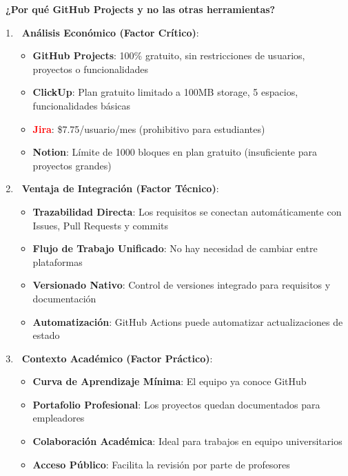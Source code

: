 \documentclass[12pt,a4paper]{article}
\begin{document}
\begin{tcolorbox}[colback=successgreen!10, colframe=successgreen, rounded corners, title=\faCheckCircle\ Análisis de la Decisión]

\textbf{\faBalanceScale\ ¿Por qué GitHub Projects y no las otras herramientas?}

\begin{enumerate}[itemsep=0.5em]
    \item \textbf{\faDollarSign\ Análisis Económico (Factor Crítico)}:
    \begin{itemize}[itemsep=0.2em]
        \item \textcolor{successgreen}{\textbf{GitHub Projects}}: 100\% gratuito, sin restricciones de usuarios, proyectos o funcionalidades
        \item \textcolor{warningorange}{\textbf{ClickUp}}: Plan gratuito limitado a 100MB storage, 5 espacios, funcionalidades básicas
        \item \textcolor{red}{\textbf{Jira}}: \$7.75/usuario/mes (prohibitivo para estudiantes)
        \item \textcolor{warningorange}{\textbf{Notion}}: Límite de 1000 bloques en plan gratuito (insuficiente para proyectos grandes)
    \end{itemize}
    
    \item \textbf{\faCodeBranch\ Ventaja de Integración (Factor Técnico)}:
    \begin{itemize}[itemsep=0.2em]
        \item \textbf{Trazabilidad Directa}: Los requisitos se conectan automáticamente con Issues, Pull Requests y commits
        \item \textbf{Flujo de Trabajo Unificado}: No hay necesidad de cambiar entre plataformas
        \item \textbf{Versionado Nativo}: Control de versiones integrado para requisitos y documentación
        \item \textbf{Automatización}: GitHub Actions puede automatizar actualizaciones de estado
    \end{itemize}
    
    \item \textbf{\faUniversity\ Contexto Académico (Factor Práctico)}:
    \begin{itemize}[itemsep=0.2em]
        \item \textbf{Curva de Aprendizaje Mínima}: El equipo ya conoce GitHub
        \item \textbf{Portafolio Profesional}: Los proyectos quedan documentados para empleadores
        \item \textbf{Colaboración Académica}: Ideal para trabajos en equipo universitarios
        \item \textbf{Acceso Público}: Facilita la revisión por parte de profesores
    \end{itemize}
    

\end{enumerate}
\end{tcolorbox}
\end{document}

